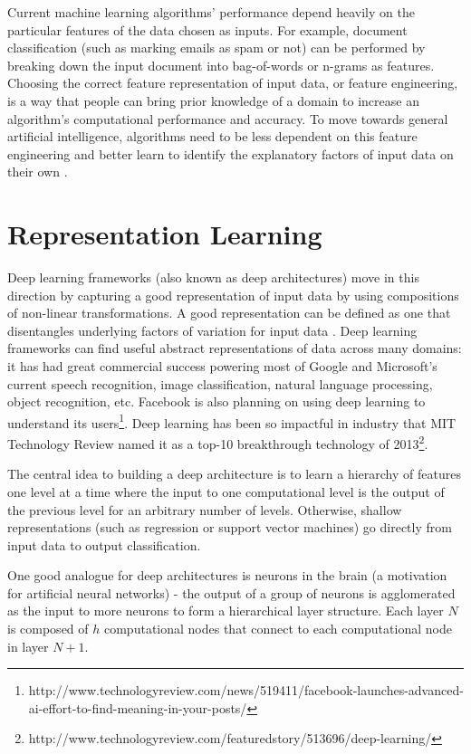 Current machine learning algorithms' performance depend heavily on the particular features of the data chosen as inputs. For example, document classification (such as marking emails as spam or not) can be performed by breaking down the input document into bag-of-words or n-grams as features. Choosing the correct feature representation of input data, or feature engineering, is a way that people can bring prior knowledge of a domain to increase an algorithm's computational performance and accuracy. To move towards general artificial intelligence, algorithms need to be less dependent on this feature engineering and better learn to identify the explanatory factors of input data on their own \cite{bengio12}.

\section{Representation Learning}
Deep learning frameworks (also known as deep architectures) move in this direction by capturing a good representation of input data by using compositions of non-linear transformations. A good representation can be defined as one that disentangles underlying factors of variation for input data \cite{bengio13}. Deep learning frameworks can find useful abstract representations of data across many domains: it has had great commercial success powering most of Google and Microsoft's current speech recognition, image classification, natural language processing, object recognition, etc. Facebook is also planning on using deep learning to understand its users\footnote{http://www.technologyreview.com/news/519411/facebook-launches-advanced-ai-effort-to-find-meaning-in-your-posts/}. Deep learning has been so impactful in industry that MIT Technology Review named it as a top-10 breakthrough technology of 2013\footnote{http://www.technologyreview.com/featuredstory/513696/deep-learning/}.

The central idea to building a deep architecture is to learn a hierarchy of features one level at a time where the input to one computational level is the output of the previous level for an arbitrary number of levels. Otherwise, shallow representations (such as regression or support vector machines) go directly from input data to output classification.

One good analogue for deep architectures is neurons in the brain (a motivation for artificial neural networks) - the output of a group of neurons is agglomerated as the input to more neurons to form a hierarchical layer structure. Each layer \(N\) is composed of \(h\) computational nodes that connect to each computational node in layer \(N+1\).

